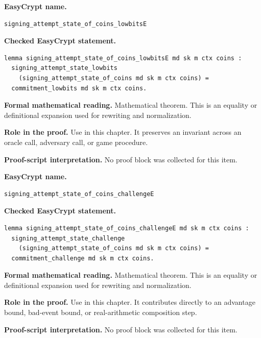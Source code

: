 \begin{formaltheorem}
\noindent\textbf{EasyCrypt name.}
\begin{lstlisting}[language=EasyCrypt,basicstyle=\ttfamily\scriptsize]
signing_attempt_state_of_coins_lowbitsE
\end{lstlisting}
\noindent\textbf{Checked EasyCrypt statement.}
\begin{lstlisting}[language=EasyCrypt,basicstyle=\ttfamily\scriptsize]
lemma signing_attempt_state_of_coins_lowbitsE md sk m ctx coins :
  signing_attempt_state_lowbits
    (signing_attempt_state_of_coins md sk m ctx coins) =
  commitment_lowbits md sk m ctx coins.
\end{lstlisting}
\noindent\textbf{Formal mathematical reading.}
Mathematical theorem. This is an equality or definitional expansion used for rewriting and normalization.

\noindent\textbf{Role in the proof.}
Use in this chapter. It preserves an invariant across an oracle call, adversary call, or game procedure.

\noindent\textbf{Proof-script interpretation.}
No proof block was collected for this item.

\end{formaltheorem}

\begin{formaltheorem}
\noindent\textbf{EasyCrypt name.}
\begin{lstlisting}[language=EasyCrypt,basicstyle=\ttfamily\scriptsize]
signing_attempt_state_of_coins_challengeE
\end{lstlisting}
\noindent\textbf{Checked EasyCrypt statement.}
\begin{lstlisting}[language=EasyCrypt,basicstyle=\ttfamily\scriptsize]
lemma signing_attempt_state_of_coins_challengeE md sk m ctx coins :
  signing_attempt_state_challenge
    (signing_attempt_state_of_coins md sk m ctx coins) =
  commitment_challenge md sk m ctx coins.
\end{lstlisting}
\noindent\textbf{Formal mathematical reading.}
Mathematical theorem. This is an equality or definitional expansion used for rewriting and normalization.

\noindent\textbf{Role in the proof.}
Use in this chapter. It contributes directly to an advantage bound, bad-event bound, or real-arithmetic composition step.

\noindent\textbf{Proof-script interpretation.}
No proof block was collected for this item.

\end{formaltheorem}

